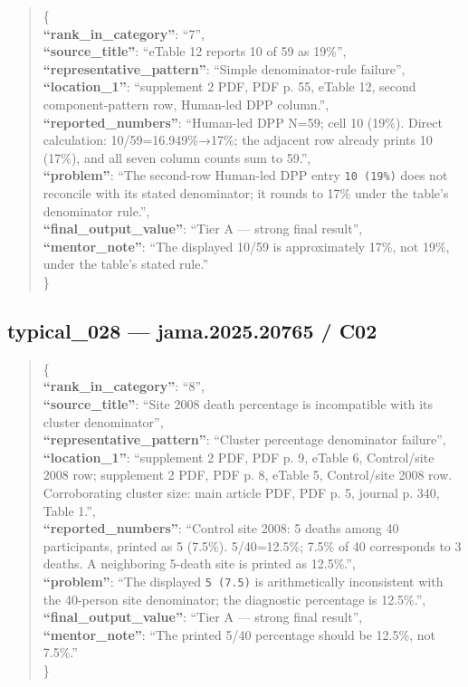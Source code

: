 \documentclass[
  letterpaper,
  9pt]{extreport}
\begin{document}
\begin{quote}
\{\\
\textbf{``rank\_in\_category''}: ``7'',\\
\textbf{``source\_title''}: ``eTable 12 reports 10 of 59 as 19\%'',\\
\textbf{``representative\_pattern''}: ``Simple denominator-rule
failure'',\\
\textbf{``location\_1''}: ``supplement 2 PDF, PDF p. 55, eTable 12,
second component-pattern row, Human-led DPP column.'',\\
\textbf{``reported\_numbers''}: ``Human-led DPP N=59; cell 10 (19\%).
Direct calculation: 10/59=16.949\%→17\%; the adjacent row already prints
10 (17\%), and all seven column counts sum to 59.'',\\
\textbf{``problem''}: ``The second-row Human-led DPP entry
\texttt{10\ (19\%)} does not reconcile with its stated denominator; it
rounds to 17\% under the table's denominator rule.'',\\
\textbf{``final\_output\_value''}: ``Tier A --- strong final result'',\\
\textbf{``mentor\_note''}: ``The displayed 10/59 is approximately 17\%,
not 19\%, under the table's stated rule.''\\
\}
\end{quote}

\hypertarget{typical_028--jama202520765--c02}{%
\subsection{typical\_028 --- jama.2025.20765 /
C02}\label{typical_028--jama202520765--c02}}

\begin{quote}
\{\\
\textbf{``rank\_in\_category''}: ``8'',\\
\textbf{``source\_title''}: ``Site 2008 death percentage is incompatible
with its cluster denominator'',\\
\textbf{``representative\_pattern''}: ``Cluster percentage denominator
failure'',\\
\textbf{``location\_1''}: ``supplement 2 PDF, PDF p. 9, eTable 6,
Control/site 2008 row; supplement 2 PDF, PDF p. 8, eTable 5,
Control/site 2008 row. Corroborating cluster size: main article PDF, PDF
p. 5, journal p. 340, Table 1.'',\\
\textbf{``reported\_numbers''}: ``Control site 2008: 5 deaths among 40
participants, printed as 5 (7.5\%). 5/40=12.5\%; 7.5\% of 40 corresponds
to 3 deaths. A neighboring 5-death site is printed as 12.5\%.'',\\
\textbf{``problem''}: ``The displayed \texttt{5\ (7.5)} is
arithmetically inconsistent with the 40-person site denominator; the
diagnostic percentage is 12.5\%.'',\\
\textbf{``final\_output\_value''}: ``Tier A --- strong final result'',\\
\textbf{``mentor\_note''}: ``The printed 5/40 percentage should be
12.5\%, not 7.5\%.''\\
\}
\end{quote}
\end{document}
